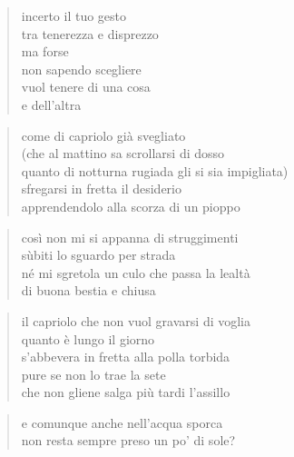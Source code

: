 \clearpage


\vspace*{2cm}

	\begin{verse}
		incerto il tuo gesto\\
		tra tenerezza e disprezzo\\
		ma forse\\
		non sapendo scegliere\\
		vuol tenere di una cosa\\
		e dell'altra
	\end{verse}

\clearpage


\vspace*{2cm}

	\begin{verse}
		come di capriolo già svegliato\\
		(che al mattino sa scrollarsi di dosso\\
		quanto di notturna rugiada gli si sia impigliata)\\
		sfregarsi in fretta il desiderio\\
		apprendendolo alla scorza di un pioppo
	\end{verse}

	\begin{verse}
		così non mi si appanna di struggimenti\\
		sùbiti lo sguardo per strada\\
		né mi sgretola un culo che passa la lealtà\\
		di buona bestia e chiusa
	\end{verse}

	\begin{verse}
		il capriolo che non vuol gravarsi di voglia\\
		quanto è lungo il giorno\\
		s'abbevera in fretta alla polla torbida\\
		pure se non lo trae la sete\\
		che non gliene salga più tardi l'assillo
	\end{verse}

	\begin{verse}
		e comunque anche nell’acqua sporca\\
		non resta sempre preso un po' di sole?
	\end{verse}

